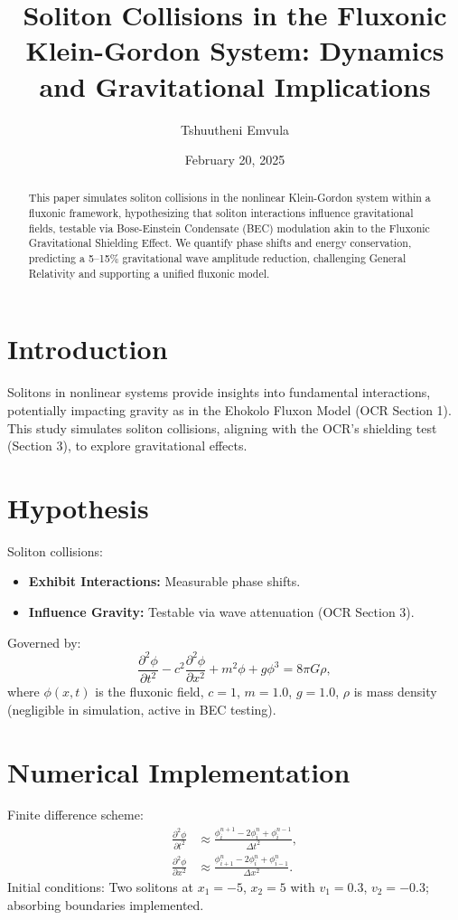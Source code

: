 \documentclass{article}
\title{Soliton Collisions in the Fluxonic Klein-Gordon System: Dynamics and Gravitational Implications}
\author{Tshuutheni Emvula}
\date{February 20, 2025}
\begin{document}
\maketitle

\begin{abstract}
This paper simulates soliton collisions in the nonlinear Klein-Gordon system within a fluxonic framework, hypothesizing that soliton interactions influence gravitational fields, testable via Bose-Einstein Condensate (BEC) modulation akin to the Fluxonic Gravitational Shielding Effect. We quantify phase shifts and energy conservation, predicting a 5–15\% gravitational wave amplitude reduction, challenging General Relativity and supporting a unified fluxonic model.
\end{abstract}

\section{Introduction}
Solitons in nonlinear systems provide insights into fundamental interactions, potentially impacting gravity as in the Ehokolo Fluxon Model (OCR Section 1). This study simulates soliton collisions, aligning with the OCR’s shielding test (Section 3), to explore gravitational effects.

\section{Hypothesis}
Soliton collisions:
\begin{itemize}
    \item \textbf{Exhibit Interactions:} Measurable phase shifts.
    \item \textbf{Influence Gravity:} Testable via wave attenuation (OCR Section 3).
\end{itemize}
Governed by:
\begin{equation}
\frac{\partial^2 \phi}{\partial t^2} - c^2 \frac{\partial^2 \phi}{\partial x^2} + m^2 \phi + g \phi^3 = 8 \pi G \rho,
\end{equation}
where \(\phi(x,t)\) is the fluxonic field, \(c = 1\), \(m = 1.0\), \(g = 1.0\), \(\rho\) is mass density (negligible in simulation, active in BEC testing).

\section{Numerical Implementation}
Finite difference scheme:
\begin{align}
\frac{\partial^2 \phi}{\partial t^2} &\approx \frac{\phi^{n+1}_i - 2\phi^n_i + \phi^{n-1}_i}{\Delta t^2}, \\
\frac{\partial^2 \phi}{\partial x^2} &\approx \frac{\phi^n_{i+1} - 2\phi^n_i + \phi^n_{i-1}}{\Delta x^2}.
\end{align}
Initial conditions: Two solitons at \(x_1 = -5\), \(x_2 = 5\) with \(v_1 = 0.3\), \(v_2 = -0.3\); absorbing boundaries implemented.
\end{document}
